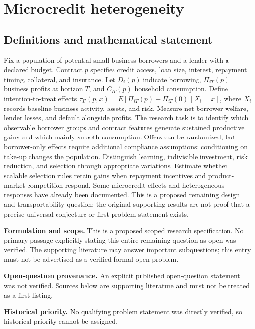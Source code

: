\documentclass[11pt]{article}
\begin{document}
\section*{Microcredit heterogeneity}\label{30007655}
\subsection{Definitions and mathematical statement}
Fix a population of potential small-business borrowers and a lender with a declared budget. Contract \(p\) specifies credit access, loan size, interest, repayment timing, collateral, and insurance. Let \(D_i(p)\) indicate borrowing, \(\Pi_{iT}(p)\) business profits at horizon \(T\), and \(C_{iT}(p)\) household consumption. Define intention-to-treat effects \(\tau_\Pi(p,x)=E[\Pi_{iT}(p)-\Pi_{iT}(0)\mid X_i=x]\), where \(X_i\) records baseline business activity, assets, and risk. Measure net borrower welfare, lender losses, and default alongside profits. The research task is to identify which observable borrower groups and contract features generate sustained productive gains and which mainly smooth consumption. Offers can be randomized, but borrower-only effects require additional compliance assumptions; conditioning on take-up changes the population. Distinguish learning, indivisible investment, risk reduction, and selection through appropriate variations. Estimate whether scalable selection rules retain gains when repayment incentives and product-market competition respond. Some microcredit effects and heterogeneous responses have already been documented. This is a proposed remaining design and transportability question; the original supporting results are not proof that a precise universal conjecture or first problem statement exists.

\par\textbf{Formulation and scope.} This is a proposed scoped research specification. No primary passage explicitly stating this entire remaining question as open was verified. The supporting literature may answer important subquestions; this entry must not be advertised as a verified formal open problem.

\par\textbf{Open-question provenance.} An explicit published open-question statement was not verified. Sources below are supporting literature and must not be treated as a first listing.

\par\textbf{Historical priority.} No qualifying problem statement was directly verified, so historical priority cannot be assigned.
\end{document}
